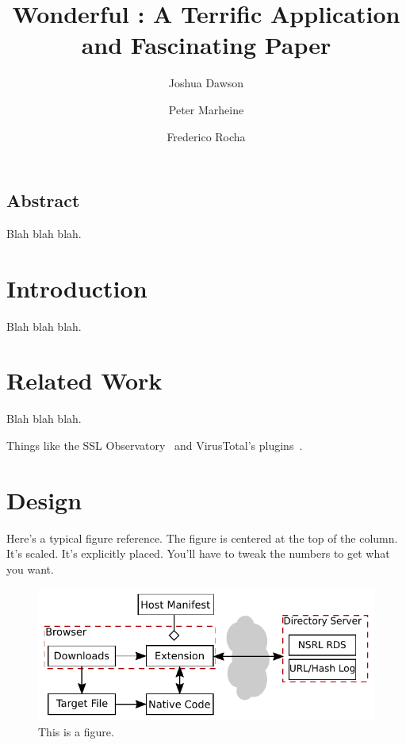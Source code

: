 \documentclass[letterpaper,twocolumn,10pt]{article}
\begin{document}
\date{}

\title{\Large \bf Wonderful : A Terrific Application and Fascinating Paper}

\author{
{\rm Joshua Dawson}
\and
{\rm Peter Marheine}
\and
{\rm Frederico Rocha}
} %

\maketitle


\subsection*{Abstract}

Blah blah blah.

\section{Introduction}

Blah blah blah.

\section{Related Work}

Blah blah blah.

Things like the SSL Observatory~\cite{ssl-observatory} and
VirusTotal's plugins~\cite{vtzilla,vtchromizer,vtexplorer}.

\section{Design}

Here's a typical figure reference.  The figure is centered at the
top of the column.  It's scaled.  It's explicitly placed.  You'll
have to tweak the numbers to get what you want.\\

\begin{figure}[h]
    \includegraphics[width=\columnwidth]{system}
    \caption{This is a figure.}
    \label{fig:one}
\end{figure}
\end{document}

